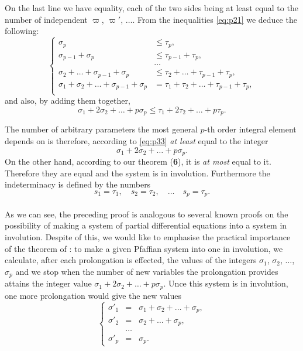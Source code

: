 \documentclass[leqno,11pt]{book}
\theoremstyle{shape1}
\theoremstyle{shapesmall}
\newcommand{\vp}{\varpi}
\begin{document}
On the last line we have equality, each of the two sides being at least equal to the number of independent $\vp$, $\vp'$, $\dots$. From the inequalities \eqref{eq:p21} we deduce the following:
\begin{equation}
  \label{eq:p32}
  \left\{
    \begin{aligned}
      \sigma_{p}&\le \tau_{p},\\
      \sigma_{p-1}+\sigma_{p}&\le \tau_{p-1}+\tau_{p},\\
      &\dots\\
      \sigma_{2}+\dots+\sigma_{p-1}+\sigma_{p}&\le\tau_{2}+\dots+ \tau_{p-1}+\tau_{p},\\
      \sigma_{1}+\sigma_{2}+\dots+\sigma_{p-1}+\sigma_{p}&=\tau_{1}+\tau_{2}+\dots+ \tau_{p-1}+\tau_{p},\\
    \end{aligned}
  \right.
\end{equation}
and also, by adding them together,
\begin{equation}
  \label{eq:p33}
  \sigma_{1}+2\sigma_{2}+\dots+p\sigma_{p}\le \tau_{1}+2\tau_{2}+\dots+p\tau_{p}.
\end{equation}

The number of arbitrary parameters the most general $p$-th order integral element depends on is therefore, according to \eqref{eq:p33} \emph{at least} equal to the integer
\[
\sigma_{1}+2\sigma_{2}+\dots+p\sigma_{p}.
\]
On the other hand, according to our theorem (\textsection\textbf{6}), it is \emph{at most} equal to it. Therefore they are equal and the system is in involution. Furthermore the indeterminacy is defined by the numbers 
\[
s_{1}=\tau_{1},\quad s_{2}=\tau_{2},\quad \dots \quad s_{p}=\tau_{p}.
\]

\paragraph{}
\label{sec:p12}
As we can see, the preceding proof is analogous to several known proofs on the possibility of making a system of partial differential equations into a system in involution. Despite of this, we would like to emphasise the practical importance of the theorem of : to make a given Pfaffian system into one in involution, we calculate, after each prolongation is effected, the values of the integers $\sigma_{1}$, $\sigma_{2}$, $\dots$, $\sigma_{p}$ and we stop when the number of new variables the prolongation provides attains the integer value $\sigma_{1}+2\sigma_{2}+\dots+ p\sigma_{p}$. Unce this system is in involution, one more prolongation would give the new values
\begin{equation}
  \label{eq:p34}
  \left\{
    \begin{alignedat}{10}
      \sigma'_{1}&{}={}&\sigma_{1}+\sigma_{2}+\dots+\sigma_{p},\\
      \sigma'_{2}&{}={}&\sigma_{2}+\dots+\sigma_{p},\\
      &\dots\\
      \sigma'_{p}&{}={}&\sigma_{p}.
    \end{alignedat}
  \right.
\end{equation}
\end{document}
